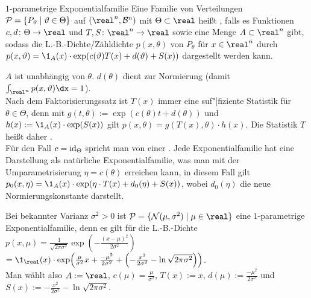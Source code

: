 \begin{Def}{$1$-parametrige Exponentialfamilie}
    Eine Familie von Verteilungen $\P = \{P_\theta \;|\; \theta \in \Theta\}$ auf
    $(\real^n, \B^n)$ mit $\Theta \subset \real$ heißt
    , falls
    es Funktionen\\
    $c, d\colon \Theta \rightarrow \real$ und
    $T, S\colon \real^n \rightarrow \real$ sowie eine Menge $A \subset \real^n$ gibt,\\
    sodass die L.-B.-Dichte/Zähldichte $p(x, \theta)$ von $P_\theta$ für $x \in \real^n$
    durch\\
    $p(x, \theta) = \1_A(x) \cdot \exp(c(\theta) T(x) + d(\theta) + S(x))$
    dargestellt werden kann.
\end{Def}

\begin{Bem}
    $A$ ist unabhängig von $\theta$.
    $d(\theta)$ dient zur Normierung (damit $\int_{\real^n} p(x, \theta)\dx = 1$).\\
    Nach dem Faktorisierungssatz ist $T(x)$ immer eine suf"|fiziente Statistik für
    $\theta \in \Theta$, denn mit $g(t, \theta) := \exp(c(\theta) t + d(\theta))$ und
    $h(x) := \1_A(x) \cdot \exp(S(x))$ gilt $p(x, \theta) = g(T(x), \theta) \cdot h(x)$.
    Die Statistik $T$ heißt daher .\\
    Für den Fall $c = \id_\Theta$ spricht man von einer .
    Jede Exponentialfamilie hat eine Darstellung als natürliche Exponentialfamilie, was man
    mit der Umparametrisierung $\eta = c(\theta)$ erreichen kann,
    in diesem Fall gilt $p_0(x, \eta) = \1_A(x) \cdot \exp(\eta \cdot T(x) + d_0(\eta) + S(x))$,
    wobei $d_0(\eta)$ die neue Normierungskonstante darstellt.
\end{Bem}

\linie

\begin{Bsp}
    Bei bekannter Varianz $\sigma^2 > 0$ ist $\P = \{\N(\mu, \sigma^2) \;|\; \mu \in \real\}$
    eine $1$-parametrige Exponentialfamilie, denn es gilt für die L.-B.-Dichte
    $p(x, \mu) = \frac{1}{\sqrt{2\pi\sigma^2}}
    \exp\!\left(-\frac{(x - \mu)^2}{2\sigma^2}\right)$\\
    $= \1_\real(x) \cdot \exp\!\left(\frac{\mu}{\sigma^2} x + \frac{-\mu^2}{2\sigma^2} +
    \left(-\frac{x^2}{2\sigma^2} - \ln \sqrt{2\pi\sigma^2}\right)\right)$.\\
    Man wählt also $A := \real$, $c(\mu) = \frac{\mu}{\sigma^2}$, $T(x) := x$,
    $d(\mu) := \frac{-\mu^2}{2\sigma^2}$ und
    $S(x) := -\frac{x^2}{2\sigma^2} - \ln \sqrt{2\pi\sigma^2}$.
\end{Bsp}

